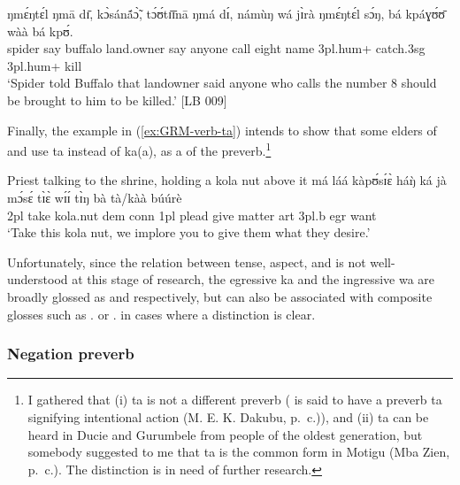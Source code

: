 \begin{exe}
\begin{exe}
\begin{exe}
\begin{exe}
\begin{exe}
\begin{exe}
\begin{exe}
\begin{exe}
\begin{exe}
\begin{exe}
\begin{exe}
\ea\label{ex:GRM-prev-wa-hypo}

\gll ŋmɛ́ŋtɛ́l   ŋmā dɪ̄, kɔ̀sánã́ɔ̃̀,   tɔ́ʊ́tɪ̄ɪ̄nā  ŋmá dɪ́, námùŋ   wá jɪ̀rà ŋmɛ́ŋtɛ́l sɔ́ŋ, bá  kpáɣʊ́ʊ̄ wàà bá kpʊ́.\\
spider  say   {\comp}   buffalo land.owner say {\comp}  anyone   {\ingr}   call eight  name {\sc 3pl.hum+} catch.{\sc 3sg} {\foc} {\sc 3pl.hum+}  kill\\
\glt `Spider told Buffalo that landowner said anyone who calls the number 8 should be brought to him to be killed.' [LB 009]
\z


Finally, the example in (\ref{ex:GRM-verb-ta})  intends to show that some elders of  and  use  {\sls ta}  instead of {\sls ka(a)},  as a  of the preverb.\footnote{I gathered that  (i)   {\sls ta} is not a different preverb ( is said to have  a preverb {\sls ta}  signifying intentional action  (M. E. K. Dakubu, p.\ c.)),  and  (ii)   {\sls ta} can be heard in  Ducie and Gurumbele from people of the oldest generation, but somebody suggested to me that {\sls ta} is the common form in Motigu (Mba Zien, p.\ c.).  The distinction is  in need of further research. } 
 

\begin{exe}
   \ex\label{ex:GRM-verb-ta}{\rm Priest talking to the shrine, holding a kola
nut above it}
\gll  má láá kàpʊ́sɪ́ɛ̀ háŋ̀ ká jà mɔ́sɛ́ tɪ̀ɛ̀ wɪ́ɪ́ tɪ̀ŋ bà 
tà/kàà búúrè\\
{\sc 2pl} take kola.nut {\sc dem} {\sc conn} {\sc 1pl} plead give matter {\sc
art} {\sc 3pl.}b {\sc  egr} want\\
\glt   `Take this kola nut, we implore  you to give them what they desire.'
\z

Unfortunately, since the relation between tense, aspect, and  is not well-understood at this stage of research, the  egressive {\sls ka}   and the ingressive  {\sls wa} are  broadly glossed as {\egr} and {\ingr} respectively, but can also be associated with composite glosses such as {\ipfv .\fut} or  {\ipfv .\pres}  in cases where a distinction is clear.


\subsubsection{Negation preverb}
\label{sec:GRM-verb-neg}




\end{exe}
\end{exe}
\end{exe}
\end{exe}
\end{exe}
\end{exe}
\end{exe}
\end{exe}
\end{exe}
\end{exe}
\end{exe}
\end{exe}
